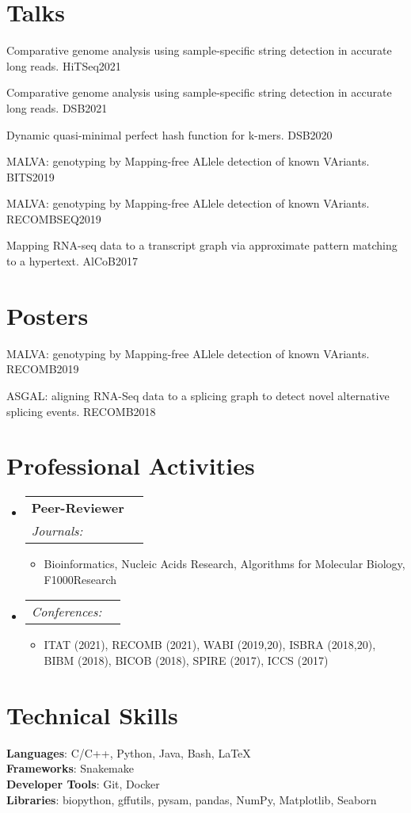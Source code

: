 \documentclass[letterpaper,11pt]{article}
\makeatletter
\newcommand{\resumeItem}[1]{
  \item\small{
    {#1 \vspace{-2pt}}
  }
}
\newcommand{\resumeSubheading}[4]{
  \vspace{-2pt}\item
    \begin{tabular*}{0.97\textwidth}[t]{l@{\extracolsep{\fill}}r}
      \textbf{#1} & #2 \\
      \textit{\small#3} & \textit{\small #4} \\
    \end{tabular*}\vspace{-7pt}
}
\newcommand{\resumeSubSubheading}[2]{
    \item
    \begin{tabular*}{0.97\textwidth}{l@{\extracolsep{\fill}}r}
      \textit{\small#1} & \textit{\small #2} \\
    \end{tabular*}\vspace{-7pt}
}
\newcommand{\resumeSubHeadingListStart}{\begin{itemize}[leftmargin=0.15in, label={}]}
\newcommand{\resumeSubHeadingListEnd}{\end{itemize}}
\newcommand{\resumeItemListStart}{\begin{itemize}}
\newcommand{\resumeItemListEnd}{\end{itemize}\vspace{-5pt}}
\makeatother
\begin{document}
\section{Talks}
{\small
\begin{etaremune}
    \item Comparative genome analysis using sample-specific string detection in accurate long reads. HiTSeq2021
    \item Comparative genome analysis using sample-specific string detection in accurate long reads. DSB2021
    \item Dynamic quasi-minimal perfect hash function for k-mers. DSB2020
    \item MALVA: genotyping by Mapping-free ALlele detection of known VAriants. BITS2019
    \item MALVA: genotyping by Mapping-free ALlele detection of known VAriants. RECOMBSEQ2019
    \item Mapping RNA-seq data to a transcript graph via approximate pattern matching to a hypertext. AlCoB2017
\end{etaremune}
}

\section{Posters}
{\small
\begin{etaremune}
    \item MALVA: genotyping by Mapping-free ALlele detection of known VAriants. RECOMB2019
    \item ASGAL: aligning RNA-Seq data to a splicing graph to detect novel alternative splicing events. RECOMB2018
\end{etaremune}
}

\section{Professional Activities}
\resumeSubHeadingListStart
    \resumeSubheading
      {Peer-Reviewer}{}
      {Journals:}{}
      \resumeItemListStart
        \resumeItem{Bioinformatics, Nucleic Acids Research, Algorithms for Molecular Biology, F1000Research}
      \resumeItemListEnd
    \resumeSubSubheading
      {Conferences:}{}
      \resumeItemListStart
        \resumeItem{ITAT (2021), RECOMB (2021), WABI (2019,20), ISBRA (2018,20), BIBM (2018), BICOB (2018), SPIRE (2017), ICCS (2017)}
      \resumeItemListEnd      
\resumeSubHeadingListEnd


\section{Technical Skills}
 \begin{itemize}[leftmargin=0.15in, label={}]
    \small{\item{
     \textbf{Languages}{: C/C++, Python, Java, Bash, \LaTeX} \\
     \textbf{Frameworks}{: Snakemake} \\
     \textbf{Developer Tools}{: Git, Docker} \\
     \textbf{Libraries}{: biopython, gffutils, pysam, pandas, NumPy, Matplotlib, Seaborn}
    }}
 \end{itemize}
\end{document}
